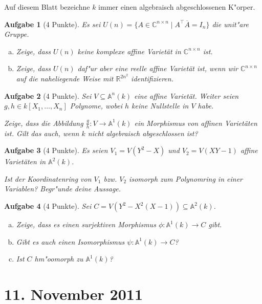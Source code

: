 \documentclass[a4paper, 12pt, numbers=noendperiod, chapterprefix=true]{scrbook}
\theoremstyle{break}
\newtheorem{Aufg}{Aufgabe}
\theoremstyle{nonumberbreak}
\theoremstyle{nonumberplain}
\newcommand{\R}{\mathbb{R}}
\newcommand{\C}{\mathbb{C}}
\newcommand{\A}{\mathbb{A}}
\newcommand{\Affine}{\mathbb{A}} %
\begin{document}
Auf diesem Blatt bezeichne $k$ immer einen algebraisch abgeschlossenen K"orper.

\begin{Aufg}[4 Punkte]
Es sei $U(n) = \{ A \in \C^{n \times n} \mid A^\top \overline A = I_n \}$ die unit"are Gruppe.
\begin{enumerate}[a)]
	\item Zeige, dass $U(n)$ keine komplexe affine Variet\"at in $\C^{n \times n}$ ist.
	\item Zeige, dass $U(n)$ daf"ur aber eine reelle affine Variet\"at ist, wenn wir $\C^{n \times n}$ auf die naheliegende Weise mit $\R^{2n^2}$ identifizieren.
\end{enumerate}\end{Aufg}

\begin{Aufg}[4 Punkte]
Sei $V \subseteq \Affine^n(k)$ eine affine Variet\"at. Weiter seien $g,h \in k[X_1, \ldots, X_n]$ Polynome, wobei $h$ keine Nullstelle in $V$ habe. 

Zeige, dass die Abbildung $\frac{g}{h} : V \to \Affine^1(k)$ ein Morphismus von affinen Variet\"aten ist. Gilt das auch, wenn $k$ nicht algebraisch abgeschlossen ist?
\end{Aufg}

\begin{Aufg}[4 Punkte]
Es seien $V_1 = V(Y^2-X)$ und $V_2 = V(XY-1)$ affine Variet\"aten in $\Affine^2(k)$. 

Ist der Koordinatenring von $V_1$ bzw. $V_2$ isomorph zum Polynomring in einer Variablen? Begr"unde deine Aussage.
\end{Aufg}

\begin{Aufg}[4 Punkte]
Sei $C = V(Y^2 - X^2(X-1))\subseteq \Affine^2(k)$.
\begin{enumerate}[a)]
	\item Zeige, dass es einen surjektiven Morphismus $\phi:\Affine^1(k)\to C$ gibt.
	\item Gibt es auch einen Isomorphismus $\psi:\Affine^1(k)\to C$?
	\item Ist $C$ hm"oomorph zu $\Affine^1(k)$?
\end{enumerate}\end{Aufg}

\newpage
\section{11. November 2011}
\setcounter{Aufg}{0}
\setcounter{Loes}{1}
\end{document}

